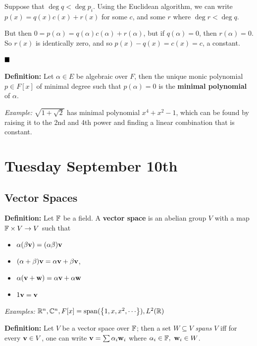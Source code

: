 Suppose that \(\deg q < \deg p_i\). Using the Euclidean algorithm, we
can write \(p(x) = q(x) c(x) + r(x)\) for some \(c\), and some \(r\)
where \(\deg r < \deg q\).

But then \(0 = p(\alpha) = q(\alpha)c(\alpha) + r(\alpha)\), but if
\(q(\alpha) = 0\), then \(r(\alpha) = 0\). So \(r(x)\) is identically
zero, and so \(p(x) - q(x) = c(x) = c\), a constant.

\(\qed\)

\textbf{Definition:} Let \(\alpha \in E\) be algebraic over \(F\), then
the unique monic polynomial \(p\in F[x]\) of minimal degree such that
\(p(\alpha) = 0\) is the \textbf{minimal polynomial} of \(\alpha\).

\emph{Example:} \(\sqrt{1 + \sqrt 2}\) has minimal polynomial
\(x^4 + x^2 - 1\), which can be found by raising it to the 2nd and 4th
power and finding a linear combination that is constant.

\hypertarget{tuesday-september-10th}{%
\section{Tuesday September 10th}\label{tuesday-september-10th}}

\hypertarget{vector-spaces}{%
\subsection{Vector Spaces}\label{vector-spaces}}

\textbf{Definition:} Let \({\mathbb{F}}\) be a field. A \textbf{vector space} is
an abelian group \(V\) with a map \({\mathbb{F}} \times V \to V\) such that

\begin{itemize}
\item
  \(\alpha(\beta \mathbf{v}) = (\alpha \beta) \mathbf{v}\)
\item
  \((\alpha + \beta)\mathbf{v} = \alpha \mathbf{v} + \beta \mathbf{v}\),
\item
  \(\alpha(\mathbf{v} + \mathbf{w}) = \alpha \mathbf{v} + \alpha \mathbf{w}\)
\item
  \(1\mathbf{v} = \mathbf{v}\)
\end{itemize}

\emph{Examples:}
\({\mathbb{R}}^n, {\mathbb{C}}^n , F[x] = \mathrm{span}(\left\{{1, x, x^2, \cdots}\right\}), L^2({\mathbb{R}})\)

\textbf{Definition:} Let \(V\) be a vector space over \({\mathbb{F}}\); then a
set \(W \subseteq V\) \emph{spans} \(V\) iff for every
\(\mathbf{v}\in V\), one can write
\(\mathbf{v} = \sum \alpha_i \mathbf{w}_i\) where
\(\alpha_i \in {\mathbb{F}},~\mathbf{w}_i \in W\).

